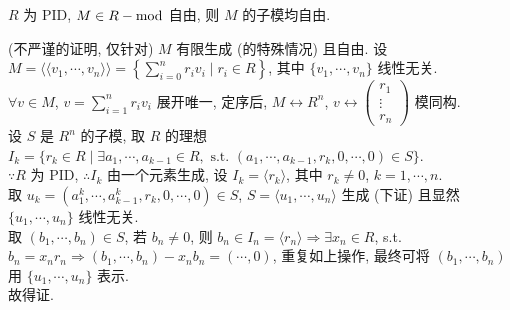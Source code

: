\documentclass{note}
\begin{document}
\begin{thm}[(课本定理 6.5)]
    $R$ 为 PID, $M\in R-\operatorname{mod}$ 自由, 则 $M$ 的子模均自由.
\end{thm}
\begin{pf}
    (不严谨的证明, 仅针对) $M$ 有限生成 (的特殊情况) 且自由. 设 $M=\langle\langle v_1,\cdots,v_n\rangle\rangle=\left\{\sum_{i=0}^nr_iv_i\mid r_i\in R\right\}$, 其中 $\{v_1,\cdots,v_n\}$ 线性无关.\\
    $\forall v\in M$, $v=\sum_{i=1}^nr_iv_i$ 展开唯一, 定序后, $M\longleftrightarrow R^{n}$, $v\longleftrightarrow\begin{pmatrix}
        r_1\\
        \vdots\\
        r_n
    \end{pmatrix}$ 模同构.\\
    设 $S$ 是 $R^n$ 的子模, 取 $R$ 的理想 $I_k=\{r_k\in R\mid\exists a_1,\cdots,a_{k-1}\in R,\text{ s.t. }(a_1,\cdots,a_{k-1},r_k,0,\cdots,0)\in S\}$.\\
    $\because R$ 为 PID, $\therefore I_k$ 由一个元素生成, 设 $I_k=\langle r_k\rangle$, 其中 $r_k\neq 0$, $k=1,\cdots,n$.\\
    取 $u_k=(a_1^k,\cdots,a_{k-1}^k,r_k,0,\cdots,0)\in S$, $S=\langle u_1,\cdots,u_n\rangle$ 生成 (下证) 且显然 $\{u_1,\cdots,u_n\}$ 线性无关.\\
    取 $(b_1,\cdots,b_n)\in S$, 若 $b_n\neq 0$, 则 $b_n\in I_n=\langle r_n\rangle\Longrightarrow\exists x_n\in R$, s.t. $b_n=x_nr_n\Longrightarrow(b_1,\cdots,b_n)-x_nb_n=(\cdots,0)$,
    重复如上操作, 最终可将 $(b_1,\cdots,b_n)$ 用 $\{u_1,\cdots,u_n\}$ 表示.\\
    故得证.
\end{pf}
\end{document}
